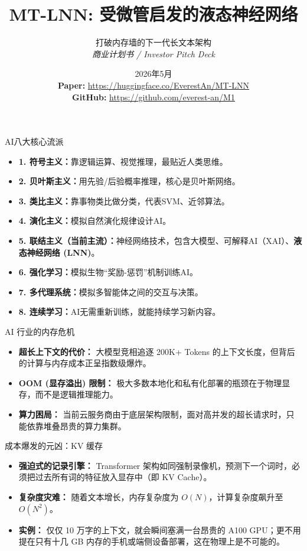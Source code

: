 ﻿\documentclass[aspectratio=169, 10pt]{beamer}
\title{MT-LNN: 受微管启发的液态神经网络}
\subtitle{打破内存墙的下一代长文本架构 \\ \textit{商业计划书 / Investor Pitch Deck}}
\author{\Huge \aeonik{Awareness}}
\date{2026年5月 \\[1em]
\footnotesize
\textbf{Paper:} \url{https://huggingface.co/EverestAn/MT-LNN} \\
\textbf{GitHub:} \url{https://github.com/everest-an/M1}
}
\begin{document}
\frame{\titlepage}

\begin{frame}{AI八大核心流派}
\begin{itemize}
    \item \textbf{1. 符号主义：}靠逻辑运算、视觉推理，最贴近人类思维。
    \item \textbf{2. 贝叶斯主义：}用先验/后验概率推理，核心是贝叶斯网络。
    \item \textbf{3. 类比主义：}靠事物类比做分类，代表SVM、近邻算法。
    \item \textbf{4. 演化主义：}模拟自然演化规律设计AI。
    \item \textbf{5. 联结主义（当前主流）：}神经网络技术，包含大模型、可解释AI（XAI）、\textbf{液态神经网络 (LNN)}。
    \item \textbf{6. 强化学习：}模拟生物“奖励-惩罚”机制训练AI。
    \item \textbf{7. 多代理系统：}模拟多智能体之间的交互与决策。
    \item \textbf{8. 连续学习：}AI无需重新训练，就能持续学习新内容。
\end{itemize}
\end{frame}

\begin{frame}{AI 行业的内存危机}
\begin{itemize}
    \item \textbf{超长上下文的代价：} 大模型竞相追逐 200K+ Tokens 的上下文长度，但背后的计算与内存成本正呈指数级爆炸。
    \item \textbf{OOM (显存溢出) 限制：} 极大多数本地化和私有化部署的瓶颈在于物理显存，而不是逻辑推理能力。
    \item \textbf{算力困局：} 当前云服务商由于底层架构限制，面对高并发的超长请求时，只能依靠堆叠昂贵的算力集群。
\end{itemize}
\end{frame}

\begin{frame}{成本爆发的元凶：KV 缓存}
\begin{itemize}
    \item \textbf{强迫式的记录引擎：} Transformer 架构如同强制录像机，预测下一个词时，必须把过去所有词的特征放入显存中（即 KV Cache）。
    \item \textbf{复杂度灾难：} 随着文本增长，内存复杂度为 $O(N)$，计算复杂度飙升至 $O(N^2)$。
    \item \textbf{实例：} 仅仅 10 万字的上下文，就会瞬间塞满一台昂贵的 A100 GPU；更不用提在只有十几 GB 内存的手机或端侧设备部署，这在物理上是不可能的。
\end{itemize}
\end{frame}
\end{document}
